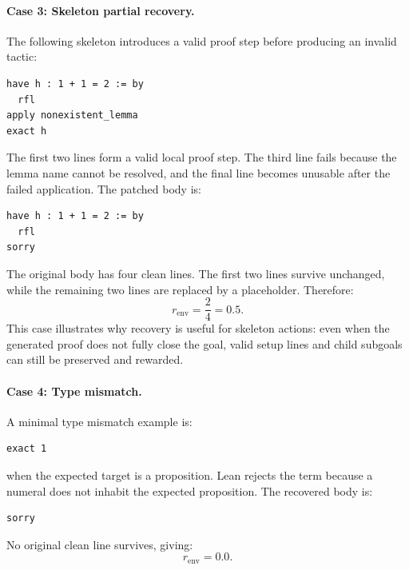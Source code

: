 \paragraph{Case 3: Skeleton partial recovery.}
The following skeleton introduces a valid proof step before producing an invalid tactic:
\begin{verbatim}
have h : 1 + 1 = 2 := by
  rfl
apply nonexistent_lemma
exact h
\end{verbatim}
The first two lines form a valid local proof step. The third line fails because the
lemma name cannot be resolved, and the final line becomes unusable after the failed application. The
patched body is:
\begin{verbatim}
have h : 1 + 1 = 2 := by
  rfl
sorry
\end{verbatim}
The original body has four clean lines. The first two lines survive unchanged, while the remaining two
lines are replaced by a placeholder. Therefore:
\[
r_{\text{env}} = \frac{2}{4} = 0.5.
\]
This case illustrates why recovery is useful for skeleton actions: even when the generated proof does not
fully close the goal, valid setup lines and child subgoals can still be preserved and rewarded.

\paragraph{Case 4: Type mismatch.}
A minimal type mismatch example is:
\begin{verbatim}
exact 1
\end{verbatim}
when the expected target is a proposition. Lean rejects the term because a numeral does not inhabit the
expected proposition. The recovered body is:
\begin{verbatim}
sorry
\end{verbatim}
No original clean line survives, giving:
\[
r_{\text{env}} = 0.0.
\]
